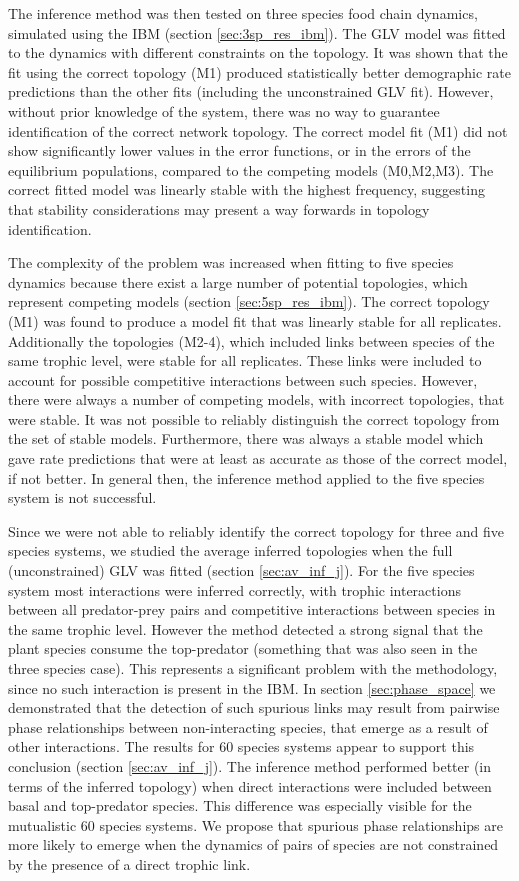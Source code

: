 The inference method was then tested on three species food chain dynamics, simulated using the IBM (section \ref{sec:3sp_res_ibm}). The GLV model was fitted to the dynamics with different constraints on the topology. It was shown that the fit using the correct topology (M1) produced statistically better demographic rate predictions than the other fits (including the unconstrained GLV fit). However, without prior knowledge of the system, there was no way to guarantee identification of the correct network topology. The correct model fit (M1) did not show significantly lower values in the error functions, or in the errors of the equilibrium populations, compared to the competing models (M0,M2,M3). The correct fitted model was linearly stable with the highest frequency, suggesting that stability considerations may present a way forwards in topology identification.

The complexity of the problem was increased when fitting to five species dynamics because there exist a large number of potential topologies, which represent competing models (section \ref{sec:5sp_res_ibm}). The correct topology (M1) was found to produce a model fit that was linearly stable for all replicates. Additionally the topologies (M2-4), which included links between species of the same trophic level, were stable for all replicates. These links were included to account for possible competitive interactions between such species. However, there were always a number of competing models, with incorrect topologies, that were stable. It was not possible to reliably distinguish the correct topology from the set of stable models. Furthermore, there was always a stable model which gave rate predictions that were at least as accurate as those of the correct model, if not better. In general then, the inference method applied to the five species system is not successful. 

Since we were not able to reliably identify the correct topology for three and five species systems, we studied the average inferred topologies when the full (unconstrained) GLV was fitted (section \ref{sec:av_inf_j}). For the five species system most interactions were inferred correctly, with trophic interactions between all predator-prey pairs and competitive interactions between species in the same trophic level. However the method detected a strong signal that the plant species consume the top-predator (something that was also seen in the three species case). This represents a significant problem with the methodology, since no such interaction is present in the IBM. In section \ref{sec:phase_space} we demonstrated that the detection of such spurious links may result from pairwise phase relationships between non-interacting species, that emerge as a result of other interactions. The results for 60 species systems appear to support this conclusion (section \ref{sec:av_inf_j}). The inference method performed better (in terms of the inferred topology) when direct interactions were included between basal and top-predator species. This difference was especially visible for the mutualistic 60 species systems. We propose that spurious phase relationships are more likely to emerge when the dynamics of pairs of species are not constrained by the presence of a direct trophic link.

